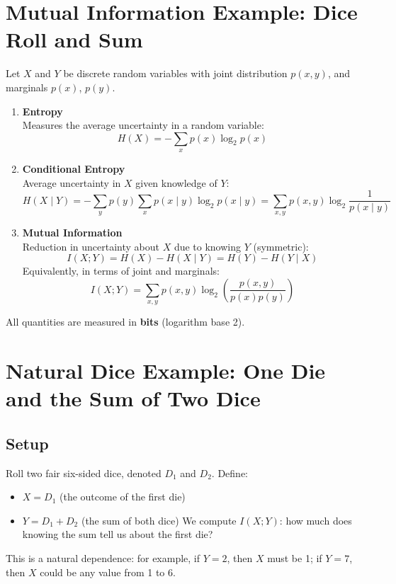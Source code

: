 \documentclass{article}
\begin{document}
\section*{Mutual Information Example: Dice Roll and Sum}

Let \(X\) and \(Y\) be discrete random variables with joint distribution \(p(x,y)\), and marginals \(p(x)\), \(p(y)\).

\begin{enumerate}
    \item \textbf{Entropy} \\
    Measures the average uncertainty in a random variable:
    \[
    H(X) = -\sum_{x} p(x) \log_2 p(x)
    \]

    \item \textbf{Conditional Entropy} \\
    Average uncertainty in \(X\) given knowledge of \(Y\):
    \[
    H(X \mid Y) = -\sum_{y} p(y) \sum_{x} p(x \mid y) \log_2 p(x \mid y) 
    = \sum_{x,y} p(x,y) \log_2 \frac{1}{p(x \mid y)}
    \]

    \item \textbf{Mutual Information} \\
    Reduction in uncertainty about \(X\) due to knowing \(Y\) (symmetric):
    \[
    I(X;Y) = H(X) - H(X \mid Y) = H(Y) - H(Y \mid X)
    \]
    Equivalently, in terms of joint and marginals:
    \[
    I(X;Y) = \sum_{x,y} p(x,y) \log_2 \left( \frac{p(x,y)}{p(x)p(y)} \right)
    \]
\end{enumerate}
All quantities are measured in \textbf{bits} (logarithm base 2).

\section*{Natural Dice Example: One Die and the Sum of Two Dice}

\subsection*{Setup}
Roll two fair six-sided dice, denoted \(D_1\) and \(D_2\). Define:


\begin{itemize}
\item \(X = D_1\) (the outcome of the first die)
    \item \(Y = D_1 + D_2\) (the sum of both dice)
We compute \(I(X;Y)\): how much does knowing the sum tell us about the first die?
\end{itemize}
This is a natural dependence: for example, if \(Y = 2\), then \(X\) must be 1; if \(Y = 7\), then \(X\) could be any value from 1 to 6.
\end{document}
